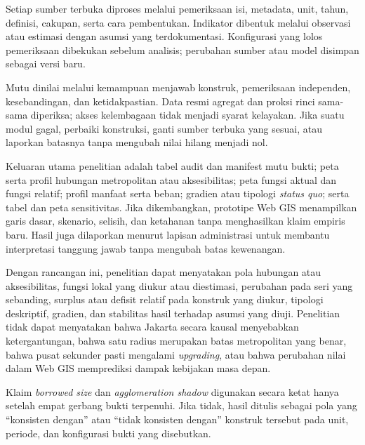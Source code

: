 \documentclass[11pt,a4paper,oneside,openany,indonesian]{report}
\begin{document}
Setiap sumber terbuka diproses melalui pemeriksaan isi, metadata, unit,
tahun, definisi, cakupan, serta cara pembentukan. Indikator dibentuk
melalui observasi atau estimasi dengan asumsi yang terdokumentasi.
Konfigurasi yang lolos pemeriksaan dibekukan sebelum analisis; perubahan
sumber atau model disimpan sebagai versi baru.

Mutu dinilai melalui kemampuan menjawab konstruk, pemeriksaan
independen, kesebandingan, dan ketidakpastian. Data resmi agregat dan
proksi rinci sama-sama diperiksa; akses kelembagaan tidak menjadi syarat
kelayakan. Jika suatu modul gagal, perbaiki konstruksi, ganti sumber
terbuka yang sesuai, atau laporkan batasnya tanpa mengubah nilai hilang
menjadi nol.

Keluaran utama penelitian adalah tabel audit dan manifest mutu bukti;
peta serta profil hubungan metropolitan atau aksesibilitas; peta fungsi
aktual dan fungsi relatif; profil manfaat serta beban; gradien atau
tipologi \emph{status quo}; serta tabel dan peta sensitivitas. Jika
dikembangkan, prototipe Web GIS menampilkan garis dasar, skenario,
selisih, dan ketahanan tanpa menghasilkan klaim empiris baru. Hasil juga
dilaporkan menurut lapisan administrasi untuk membantu interpretasi
tanggung jawab tanpa mengubah batas kewenangan.

Dengan rancangan ini, penelitian dapat menyatakan pola hubungan atau
aksesibilitas, fungsi lokal yang diukur atau diestimasi, perubahan pada
seri yang sebanding, surplus atau defisit relatif pada konstruk yang
diukur, tipologi deskriptif, gradien, dan stabilitas hasil terhadap
asumsi yang diuji. Penelitian tidak dapat menyatakan bahwa Jakarta
secara kausal menyebabkan ketergantungan, bahwa satu radius merupakan
batas metropolitan yang benar, bahwa pusat sekunder pasti mengalami
\emph{upgrading}, atau bahwa perubahan nilai dalam Web GIS memprediksi
dampak kebijakan masa depan.

Klaim \emph{borrowed size} dan \emph{agglomeration shadow} digunakan
secara ketat hanya setelah empat gerbang bukti terpenuhi. Jika tidak,
hasil ditulis sebagai pola yang ``konsisten dengan'' atau ``tidak
konsisten dengan'' konstruk tersebut pada unit, periode, dan konfigurasi
bukti yang disebutkan.
\end{document}

